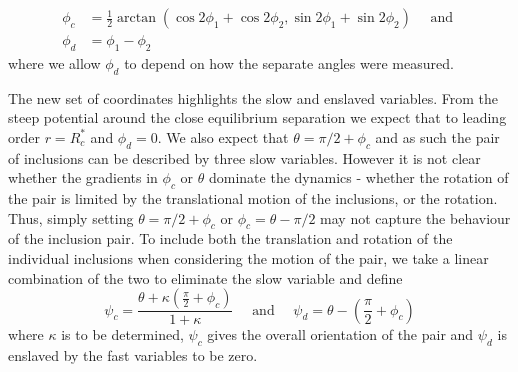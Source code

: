 \begin{equation}
\begin{split}
\phi_c &= \frac{1}{2}\arctan\left(\cos2\phi_1+\cos2\phi_2,\sin2\phi_1+\sin2\phi_2\right) \quad\text{ and } \\
\phi_d &= \phi_1 - \phi_2
\end{split}
\end{equation}
where we allow $\phi_d$ to depend on how the separate angles were measured. 

The new set of coordinates highlights the slow and enslaved variables. From the steep potential around the close equilibrium separation we expect that to leading order $r=R^*_c$ and $\phi_d=0$. We also expect that $\theta= \pi/2 + \phi_c$ and as such the pair of inclusions can be described by three slow variables. However it is not clear whether the gradients in $\phi_c$ or $\theta$ dominate the dynamics - whether the rotation of the pair is limited by the translational motion of the inclusions, or the rotation. Thus, simply setting $\theta= \pi/2 + \phi_c$ or $\phi_c = \theta - \pi/2$ may not capture the behaviour of the inclusion pair. To include both the translation and rotation of the individual inclusions when considering the motion of the pair, we take a linear combination of the two to eliminate the slow variable and define
\begin{equation}
    \psi_c = \frac{\theta + \kappa (\frac{\pi}{2} + \phi_c)}{1+\kappa} \quad\text{ and }\quad \psi_d = \theta - \left(\frac{\pi}{2} + \phi_c \right)
\end{equation}
where $\kappa$ is to be determined, $\psi_c$ gives the overall orientation of the pair and $\psi_d$ is enslaved by the fast variables to be zero.


